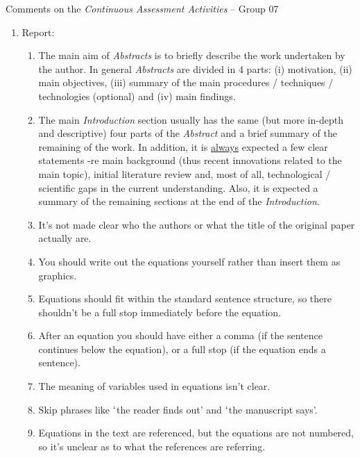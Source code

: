 \documentclass[14pt,twoside]{report}
\begin{document}
\clearpage




\bigskip

\begin{center}
  {\Large Comments on the {\it Continuous Assessment Activities} -- Group 07}
\end{center}

\begin{enumerate}

\item Report:
\begin{enumerate}
%
\item The main aim of {\it Abstracts} is to briefly describe the work undertaken by the author. In general {\it Abstracts} are divided in 4 parts: (i) motivation, (ii) main objectives, (iii) summary of the main procedures / techniques / technologies (optional) and (iv) main findings. 
%
\item The main {\it Introduction} section usually has the same (but more in-depth and descriptive) four parts of the {\it Abstract} and a brief summary of the remaining of the work. In addition, it is \underline{always} expected a few clear statements -re main background (thus recent innovations related to the main topic), initial literature review and, most of all, technological / scientific gaps in the current understanding. Also, it is expected a summary of the remaining sections at the end of the {\it Introduction}.
%
\item It's not made clear who the authors or what the title of the original paper actually are.
%
\item You should write out the equations yourself rather than insert them as graphics.
%
\item Equations should fit within the standard sentence structure, so there shouldn't be a full stop immediately before the equation. 
%
\item After an equation you should have either a comma (if the sentence continues below the equation), or a full stop (if the equation ends a sentence).
%
\item The meaning of variables used in equations isn't clear.
%
\item Skip phrases like $\lq$the reader finds out' and $\lq$the manuscript says'.
%
\item Equations in the text are referenced, but the equations are not numbered, so it's unclear as to what the references are referring.

\end{enumerate}
\end{enumerate}
\end{document}
